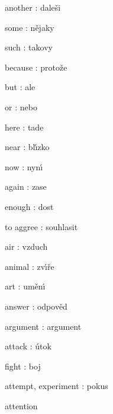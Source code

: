 \documentclass{scrartcl}
\begin{document}
another : dale\v si

some : n\v ejaky

such : takovy

because : proto\v ze

but : ale

or : nebo

here : tade

near : bl\'\i zko

now : nyn\'\i

again : zase

enough : dost



to aggree : souhlasit

air : vzduch

animal : zv\'\i\v re

art : um\v en\'\i

answer : odpov\v ed

argument : argument

attack : \'utok

fight : boj

attempt, experiment : pokus

attention 
\end{document}
